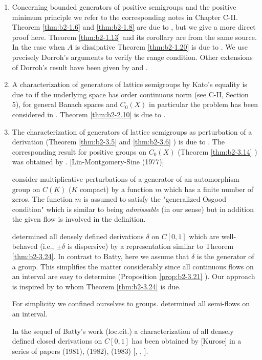 \begin{enumerate}[label=\emph{Section \arabic*:}, wide]

\item
Concerning bounded generators of positive semigroups and the positive minimum principle we refer to the corresponding notes in Chapter C-II.
Theorem \ref{thm:b2-1.6} and \ref{thm:b2-1.8} are due to \citet{arendtchernoffkato:1982}, but we give a more direct proof here.
Theorem \ref{thm:b2-1.13} and its corollary are from the same source.
In the case when $A$ is dissipative Theorem \ref{thm:b2-1.20} is due to \citet{dorroh:1966}.
We use precisely Dorroh's arguments to verify the range condition.
Other extensions of Dorroh's result have been given by \citet{lumer:1974} and \citet{lumer:1975}.

\item 
A characterization of generators of lattice semigroups by Kato's equality is due to  \citet{nageluhlig:1981} if the underlying space has order continuous norm (see C-II, Section 5), for general Banach spaces and $C_{0}(X)$ in particular the problem has been considered in \citet{arendt:1982}.
Theorem \ref{thm:b2-2.10} is due to \citet{uhlig:1979}.

\item
The characterization of generators of lattice semigroups as perturbation of a derivation (Theorem \ref{thm:b2-3.5} and \ref{thm:b2-3.6} ) is due to \citet{derndingernagel:1979}.
The corresponding result for positive groups on $C_{0}(X)$ (Theorem \ref{thm:b2-3.14} ) was obtained by \citet{arendtgreiner:1984}.
\citet{linetal:1977} [Lin-Montgomery-Sine (1977)] 

consider multiplicative perturbations of a generator of an automorphism group on $C(K)$ ($K$ compact) by a function $m$ which has a finite number of zeros.
The function $m$ is assumed to satisfy the "generalized Osgood condition" which is similar to being \emph{admissable} (in our sense) but in addition the given flow is involved in the definition.

\citet{batty:1981} determined all densely defined derivations $\delta$ on $C[0,1]$ which are well-behaved (i.e., $\pm\delta$ is dispersive) by a representation similar to Theorem \ref{thm:b2-3.24}.
In contrast to Batty, here we assume that $\delta$ is the generator of a group.
This simplifies the matter considerably since all continuous flows on an interval are easy to determine (Proposition \ref{prop:b2-3.21} ).
Our approach is inspired by \citet{delaubenfels:1984} to whom Theorem \ref{thm:b2-3.24} is due.

For simplicity we confined ourselves to groups.
\citet{uhlig:1979} determined all semi-flows on an interval.

In the sequel of Batty's work (loc.cit.) a characterization of all densely defined closed derivations on $C[0,1]$ has been obtained by
 [Kurose] in a series of papers (1981), (1982), (1983) [\citet{kurose:1981}, \citet{kurose:1982}, \citet{kurose:1983}].
\end{enumerate}
\RaggedRight

 

